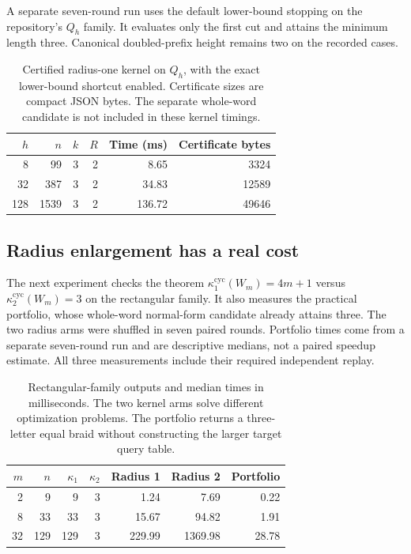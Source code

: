 \documentclass[11pt,a4paper]{article}
\theoremstyle{definition}\newtheorem{definition}[theorem]{Definition}
\theoremstyle{remark}\newtheorem{remark}[theorem]{Remark}
\newcommand{\kc}[1]{\kappa^{\mathrm{cyc}}_{#1}}
\begin{document}
A separate seven-round run uses the default lower-bound stopping on the
repository's $Q_h$ family. It evaluates only the first cut and attains the
minimum length three. Canonical doubled-prefix height remains two on the
recorded cases.

\begin{table}[ht]\centering\small
\begin{tabular}{rrrrrr}
\toprule
$h$ & $n$ & $k$ & $R$ & Time (ms) & Certificate bytes \\
\midrule
8 & 99 & 3 & 2 & 8.65 & 3324 \\
32 & 387 & 3 & 2 & 34.83 & 12589 \\
128 & 1539 & 3 & 2 & 136.72 & 49646 \\
\bottomrule
\end{tabular}
\caption{Certified radius-one kernel on $Q_h$, with the exact lower-bound
shortcut enabled. Certificate sizes are compact JSON bytes. The separate
whole-word candidate is not included in these kernel timings.}
\end{table}

\subsection{Radius enlargement has a real cost}
The next experiment checks the theorem $\kc{1}(W_m)=4m+1$ versus
$\kc{2}(W_m)=3$ on the rectangular family. It also measures the practical
portfolio, whose whole-word normal-form candidate already attains three.
The two radius arms were shuffled in seven paired rounds. Portfolio times
come from a separate seven-round run and are descriptive medians, not a
paired speedup estimate. All three measurements include their required
independent replay.

\begin{table}[ht]\centering\small
\begin{tabular}{rrrrrrr}
\toprule
$m$ & $n$ & $\kappa_1$ & $\kappa_2$ & Radius 1 & Radius 2 & Portfolio \\
\midrule
2 & 9 & 9 & 3 & 1.24 & 7.69 & 0.22 \\
8 & 33 & 33 & 3 & 15.67 & 94.82 & 1.91 \\
32 & 129 & 129 & 3 & 229.99 & 1369.98 & 28.78 \\
\bottomrule
\end{tabular}
\caption{Rectangular-family outputs and median times in milliseconds.
The two kernel arms solve different optimization problems. The portfolio
returns a three-letter equal braid without constructing the larger target
query table.}
\end{table}
\end{document}
